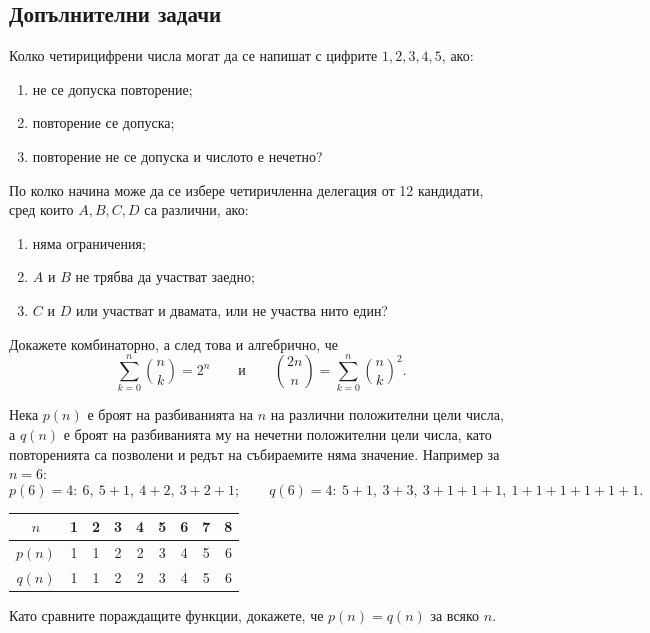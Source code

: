 \documentclass[11pt,a4paper]{article}
\newenvironment{enumeratea}{\begin{enumerate}[label=(\alph*),itemsep=0.28em,topsep=0.25em]}{\end{enumerate}}
\newcounter{problem}[section]
\begin{document}
\subsection*{Допълнителни задачи}

\begin{problem}
Колко четирицифрени числа могат да се напишат с цифрите $1,2,3,4,5$, ако:
\begin{enumeratea}
  \item не се допуска повторение;
  \item повторение се допуска;
  \item повторение не се допуска и числото е нечетно?
\end{enumeratea}
\end{problem}

\begin{problem}
По колко начина може да се избере четиричленна делегация от 12 кандидати,
сред които $A,B,C,D$ са различни, ако:
\begin{enumeratea}
  \item няма ограничения;
  \item $A$ и $B$ не трябва да участват заедно;
  \item $C$ и $D$ или участват и двамата, или не участва нито един?
\end{enumeratea}
\end{problem}

\begin{problem}
Докажете комбинаторно, а след това и алгебрично, че
\[
\sum_{k=0}^n\binom nk=2^n
\qquad
\text{и}
\qquad
\binom{2n}{n}=\sum_{k=0}^n\binom nk^2.
\]
\end{problem}

\begin{problem}
Нека $p(n)$ е броят на разбиванията на $n$ на различни положителни цели числа,
а $q(n)$ е броят на разбиванията му на нечетни положителни цели числа, като
повторенията са позволени и редът на събираемите няма значение. Например за $n=6$:
\[
p(6)=4:\ 6,\ 5+1,\ 4+2,\ 3+2+1; \qquad
q(6)=4:\ 5+1,\ 3+3,\ 3+1+1+1,\ 1+1+1+1+1+1.
\]
\begin{center}
\begin{tabular}{c|cccccccc}
  $n$    & 1 & 2 & 3 & 4 & 5 & 6 & 7 & 8 \\ \hline
  $p(n)$ & 1 & 1 & 2 & 2 & 3 & 4 & 5 & 6 \\
  $q(n)$ & 1 & 1 & 2 & 2 & 3 & 4 & 5 & 6
\end{tabular}
\end{center}
Като сравните пораждащите функции, докажете, че $p(n)=q(n)$ за всяко $n$.
\end{problem}
\end{document}
